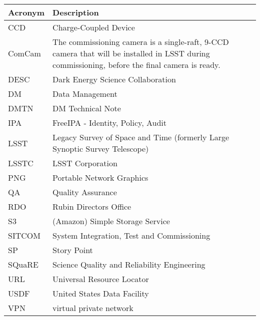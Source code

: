 \addtocounter{table}{-1}
\begin{longtable}{p{}p{}}\hline
\textbf{Acronym} & \textbf{Description}  \\\hline

CCD & Charge-Coupled Device \\\hline
ComCam & The commissioning camera is a single-raft, 9-CCD camera that will be installed in LSST during commissioning, before the final camera is ready. \\\hline
DESC & Dark Energy Science Collaboration \\\hline
DM & Data Management \\\hline
DMTN & DM Technical Note \\\hline
IPA & FreeIPA - Identity, Policy, Audit \\\hline
LSST & Legacy Survey of Space and Time (formerly Large Synoptic Survey Telescope) \\\hline
LSSTC & LSST Corporation \\\hline
PNG & Portable Network Graphics \\\hline
QA & Quality Assurance \\\hline
RDO & Rubin Directors Office \\\hline
S3 & (Amazon) Simple Storage Service \\\hline
SITCOM & System Integration, Test and Commissioning \\\hline
SP & Story Point \\\hline
SQuaRE & Science Quality and Reliability Engineering \\\hline
URL & Universal Resource Locator \\\hline
USDF & United States Data Facility \\\hline
VPN & virtual private network \\\hline
\end{longtable}
